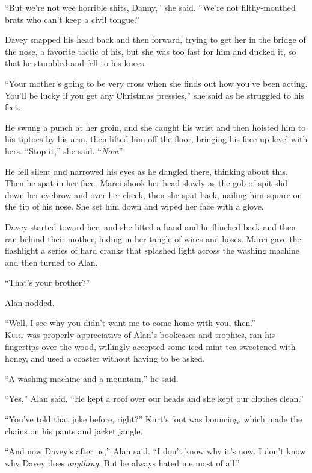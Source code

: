 \documentclass{article}
\begin{document}
``But we're not wee horrible shits, Danny,'' she said.  ``We're not
filthy-mouthed brats who can't keep a civil tongue.''

Davey snapped his head back and then forward, trying to get her in the
bridge of the nose, a favorite tactic of his, but she was too fast for
him and ducked it, so that he stumbled and fell to his knees.

``Your mother's going to be very cross when she finds out how you've
been acting.  You'll be lucky if you get any Christmas pressies,'' she
said as he struggled to his feet.

He swung a punch at her groin, and she caught his wrist and then
hoisted him to his tiptoes by his arm, then lifted him off the floor,
bringing his face up level with hers.  ``Stop it,'' she said. 
``\textit{Now}.''

He fell silent and narrowed his eyes as he dangled there, thinking
about this.  Then he spat in her face.  Marci shook her head slowly as
the gob of spit slid down her eyebrow and over her cheek, then she
spat back, nailing him square on the tip of his nose.  She set him
down and wiped her face with a glove.

Davey started toward her, and she lifted a hand and he flinched back
and then ran behind their mother, hiding in her tangle of wires and
hoses.  Marci gave the flashlight a series of hard cranks that
splashed light across the washing machine and then turned to Alan.

``That's your brother?''

Alan nodded.

``Well, I see why you didn't want me to come home with you, then.''
\\
\lettrine[lines=3, lhang=.5, nindent=0pt, findent=2pt]{K}{urt} was properly appreciative of Alan's bookcases and trophies, ran
his fingertips over the wood, willingly accepted some iced mint tea
sweetened with honey, and used a coaster without having to be asked.

``A washing machine and a mountain,'' he said.

``Yes,'' Alan said.  ``He kept a roof over our heads and she kept our
clothes clean.''

``You've told that joke before, right?'' Kurt's foot was bouncing,
which made the chains on his pants and jacket jangle.

``And now Davey's after us,'' Alan said.  ``I don't know why it's now. 
I don't know why Davey does \textit{anything}.  But he always hated me
most of all.''
\end{document}
